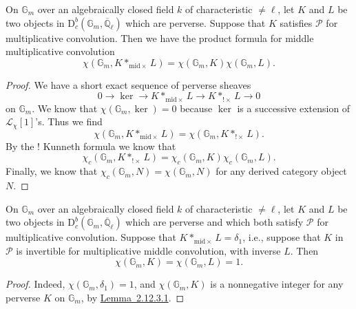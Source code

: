 On \(\mathbb{G}_m\) over an algebraically closed field \(k\) of characteristic
\(\ne\ell\), let \(K\) and \(L\) be two objects in
\(\mathrm{D}^b_c(\mathbb{G}_m,\overline{\mathbb{Q}}_\ell)\) which are
perverse. Suppose that \(K\) satisfies \(\mathcal{P}\) for multiplicative
convolution. Then we have the product formula for middle multiplicative
convolution
\[
  \chi(\mathbb{G}_m,K*_{\mathrm{mid}\times}L)
  =
  \chi(\mathbb{G}_m,K)\chi(\mathbb{G}_m,L).
\]
\begin{proof}
We have a short exact sequence of perverse sheaves
\[
  0\to\ker\to K*_{\mathrm{mid}\times}L\to K*_{!\times}L\to0
\]
on \(\mathbb{G}_m\). We know that \(\chi(\mathbb{G}_m,\ker)=0\) because
\(\ker\) is a successive extension of \(\mathcal{L}_\chi[1]\)'s. Thus we find
\[
  \chi(\mathbb{G}_m,K*_{\mathrm{mid}\times}L)
  =
  \chi(\mathbb{G}_m,K*_{!\times}L).
\]
By the \(!\) Kunneth formula we know that
\[
  \chi_c(\mathbb{G}_m,K*_{!\times}L)
  =
  \chi_c(\mathbb{G}_m,K)\chi_c(\mathbb{G}_m,L).
\]
Finally, we know that \(\chi_c(\mathbb{G}_m,N)=\chi(\mathbb{G}_m,N)\) for any
derived category object \(N\).
\end{proof}

On \(\mathbb{G}_m\) over an algebraically closed field \(k\) of characteristic
\(\ne\ell\), let \(K\) and \(L\) be two objects in
\(\mathrm{D}^b_c(\mathbb{G}_m,\overline{\mathbb{Q}}_\ell)\) which are
perverse and which both satisfy \(\mathcal{P}\) for multiplicative
convolution. Suppose that \(K*_{\mathrm{mid}\times}L=\delta_1\), i.e.,
suppose that \(K\) in \(\mathcal{P}\) is invertible for multiplicative middle
convolution, with inverse \(L\). Then
\[
  \chi(\mathbb{G}_m,K)=\chi(\mathbb{G}_m,L)=1.
\]
\begin{proof}
Indeed, \(\chi(\mathbb{G}_m,\delta_1)=1\), and
\(\chi(\mathbb{G}_m,K)\) is a nonnegative integer for any perverse \(K\) on
\(\mathbb{G}_m\), by \hyperref[lem:2.12.3.1]{Lemma~2.12.3.1}.
\end{proof}

